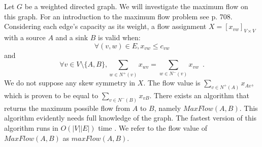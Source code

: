 \documentclass[11pt]{llncs}
\theoremstyle{definition}
\begin{document}
    Let $G$ be a weighted directed graph. We will investigate the maximum flow on this graph. For an introduction to the
    maximum flow problem see \cite{clrs} p. 708. Considering each edge's capacity as its weight, a flow assignment
    $X = [x_{vw}]_{V \times V}$ with a source $A$ and a sink $B$ is valid when:
    \begin{equation}
    \label{flow1}
       \forall (v, w) \in E, x_{vw} \leq c_{vw}
    \end{equation}
    and
    \begin{equation}
    \label{flow2}
       \forall v \in V \setminus \{A,B\}, \sum\limits_{w \in N^{+}(v)}x_{wv} = \sum\limits_{w \in N^{-}(v)}x_{vw}
       \enspace.
    \end{equation}
    We do not suppose any skew symmetry in $X$. The flow value is $\sum\limits_{v \in N^{+}\left(A\right)}x_{Av}$, which is
    proven to be equal to $\sum\limits_{v \in N^{-}\left(B\right)}x_{vB}$. There exists an algorithm that returns the maximum
    possible flow from $A$ to $B$, namely $MaxFlow\left(A, B\right)$. This algorithm evidently needs full knowledge of the
    graph. The fastest version of this algorithm runs in $O\left(|V||E|\right)$ time \cite{maxflownm}. We refer to the flow
    value of $MaxFlow\left(A, B\right)$ as $maxFlow\left(A, B\right)$.
\end{document}
